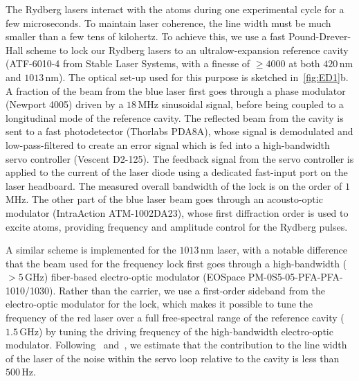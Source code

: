 \documentclass[prl,nobalancelastpage,twocolumn,superscriptaddress,nofootinbib]{revtex4}
\begin{document}
\begin{footnotesize}
The Rydberg lasers interact with the atoms during one experimental cycle for a
few microseconds. To maintain laser coherence, the line width must be
much smaller than a few tens of kilohertz. To achieve this, we use a fast
Pound-Drever-Hall scheme to lock our Rydberg lasers to an ultralow-expansion
reference cavity (ATF-6010-4 from Stable Laser Systems, with a finesse of
$\geq4000$ at both $420\,$nm and $1013\,$nm). The optical set-up used for this
purpose is sketched in~\ref{fig:ED1}b. A fraction of the beam from the blue
laser first goes through a phase modulator (Newport 4005) driven by a $18\,$MHz
sinusoidal signal, before being coupled to a longitudinal mode of the reference
cavity. The reflected beam from the cavity is sent to a fast photodetector
(Thorlabs PDA8A), whose signal is demodulated and low-pass-filtered to create
an error signal which is fed into a high-bandwidth servo controller (Vescent
D2-125). The feedback signal from the servo controller is applied to the
current of the laser diode using a dedicated fast-input port on the laser
headboard. The measured overall bandwidth of the lock is on the order of
$1\,$MHz. The other part of the blue laser beam goes through an acousto-optic
modulator (IntraAction ATM-1002DA23), whose first diffraction order is used to
excite atoms, providing frequency and amplitude control for the Rydberg pulses.

A similar scheme is implemented for the $1013\,$nm laser, with a notable
difference that the beam used for the frequency lock first goes through a
high-bandwidth ($>5\,$GHz) fiber-based electro-optic modulator (EOSpace
PM-0S5-05-PFA-PFA-1010/1030). Rather than the carrier, we use a first-order
sideband from the electro-optic modulator for the lock, which makes it possible
to tune the frequency of the red laser over a full free-spectral range of the
reference cavity ($1.5\,$GHz) by tuning the driving frequency of the
high-bandwidth electro-optic modulator. Following~\cite{Hall1992}
and~\cite{Fox2003}, we estimate that the contribution to the line width of the
laser of the noise within the servo loop relative to the cavity is less than
$500\,$Hz.


\end{footnotesize}
\end{document}
